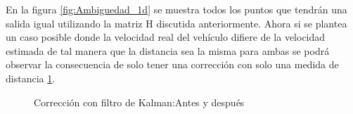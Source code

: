 En la figura \ref{fig:Ambiguedad_1d} se muestra todos los puntos que tendrán una salida igual utilizando la matriz H discutida anteriormente. Ahora si se plantea un caso posible donde la velocidad real del vehículo difiere de la velocidad estimada de tal manera que la distancia sea la misma para ambas se podrá observar la consecuencia de solo tener una corrección con solo una medida de distancia \ref{fig:Correción2car}. 

\begin{figure}[!htb]
  \begin{center}
    \caption{Corrección con filtro de Kalman:Antes y después}
    \label{fig:Correción2car}
  \end{center}
\end{figure}